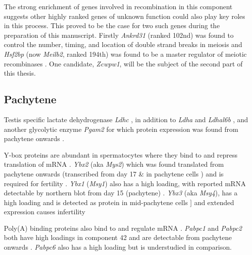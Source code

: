 The strong enrichment of genes involved in recombination in this component suggests other highly ranked genes of unknown function could also play key roles in this process. This proved to be the case for two such genes during the preparation of this manuscript. Firstly \textit{Ankrd31} (ranked 102nd) was found to control the number, timing, and location of double strand breaks in meiosis \cite{Boekhout2018REC114, Papanikos2018ANKRD31} and \textit{Hsf2bp} (now \textit{Meilb2}, ranked 194th) was found to be a master regulator of meiotic recombinases \cite{Zhang2019meiosisspecific}. One candidate, \textit{Zcwpw1}, will be the subject of the second part of this thesis.


\subsection{Pachytene}

Testis specific lactate dehydrogenase \textit{Ldhc} \parencite{Goldberg1963Lactic, Blanco1963Lactate, Goldberg2010LDHC}, in addition to \textit{Ldha} and \textit{Ldhal6b} \parencite{Wang2005Cloning}, and another glycolytic enzyme \textit{Pgam2} for which protein expression was found from pachytene onwards \parencite{Fundele1987Developmental}.

Y-box proteins are abundant in spermatocytes where they bind to and repress translation of mRNA \parencite[Reviwed in]{Kleene2016Positiondependent}. \textit{Ybx2} (aka \textit{Mys2}) which was found translated from pachytene onwards \parencite{Kwon1993Proteins, Oko1996Germ} (transcribed from day 17 \& in pachytene cells \parencite{Gu1998Mammalian}) and is required for fertility \parencite{Yang2005Absence}. \textit{Ybx1} (\textit{Msy1}) also has a high loading, with reported mRNA detectable by northern blot from day 15 (pachytene) \parencite{Tafuri1993mouse}. \textit{Ybx3} (aka \textit{Msy4}), has a high loading and is detected as protein in mid-pachytene cells \parencite{Davies2000SequenceSpecific}] and extended expression causes infertility \parencite{Giorgini2002Translational}

Poly(A) binding proteins also bind to and regulate mRNA \parencite[reviewed in]{OZTURK2018Potential}. \textit{Pabpc1} and \textit{Pabpc2} both have high loadings in component 42 and are detectable from pachytene onwards \parencite{C.Kleene1994Developmental, Gu1995Poly, Kleene1998Mouse, Lee2000Expression, Kimura2009Characterization}. \textit{Pabpc6} also has a high loading but is understudied in comparison.

